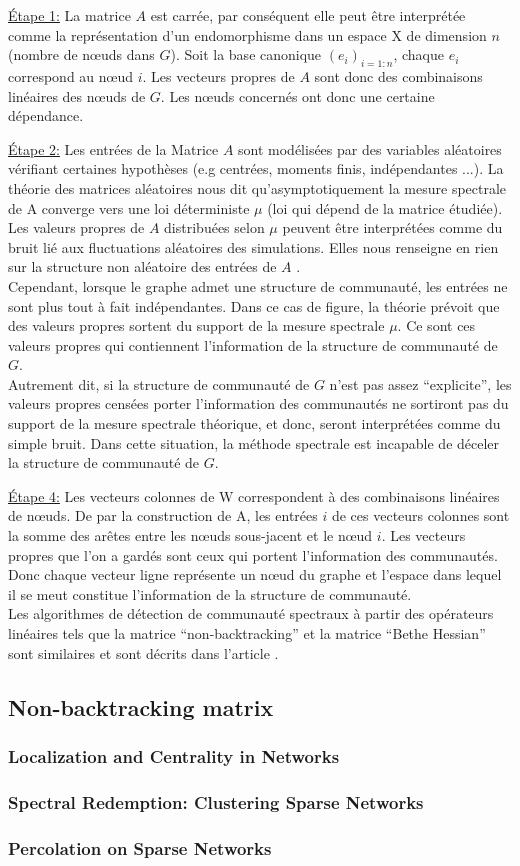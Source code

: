 \par{\underline{Étape 1:}}
La matrice $A$ est carrée, par conséquent elle peut être interprétée comme la représentation d'un endomorphisme dans un espace X de dimension $n$ (nombre de nœuds dans $G$).
Soit la base canonique $(e_i)_{i=1:n}$, chaque $e_i$ correspond au nœud $i$.
Les vecteurs propres de $A$ sont donc des combinaisons linéaires des nœuds de $G$.
Les nœuds concernés ont donc une certaine dépendance.
\par{\underline{Étape 2:}}
Les entrées de la Matrice $A$ sont modélisées par des variables aléatoires vérifiant certaines hypothèses (e.g centrées, moments finis, indépendantes ...).
La théorie des matrices aléatoires nous dit qu’asymptotiquement la mesure spectrale de A converge vers une loi déterministe $\mu$ (loi qui dépend de la matrice étudiée).
Les valeurs propres de $A$ distribuées selon $\mu$ peuvent être interprétées comme du bruit lié aux fluctuations aléatoires des simulations.
Elles nous renseigne en rien sur la structure non aléatoire des entrées de $A$ .\\
Cependant, lorsque le graphe admet une structure de communauté, les entrées ne sont plus tout à fait indépendantes.
Dans ce cas de figure, la théorie prévoit que des valeurs propres sortent du support de la mesure spectrale $\mu$.
Ce sont ces valeurs propres qui contiennent l'information de la structure de communauté de $G$.\\
Autrement dit, si la structure de communauté de $G$ n'est pas assez ``explicite'', les valeurs propres censées porter l'information des communautés ne sortiront pas du support de la mesure spectrale théorique, et donc, seront interprétées comme du simple bruit.
Dans cette situation, la méthode spectrale est incapable de déceler la structure de communauté de $G$.
\par{\underline{Étape 4:}}
Les vecteurs colonnes de W correspondent à des combinaisons linéaires de nœuds.
De par la construction de A, les entrées $i$ de ces vecteurs colonnes sont la somme des arêtes entre les nœuds sous-jacent et le nœud $i$.
Les vecteurs propres que l'on a gardés sont ceux qui portent l'information des communautés.
Donc chaque vecteur ligne représente un nœud du graphe et l'espace dans lequel il se meut constitue l'information de la structure de communauté.\\

Les algorithmes de détection de communauté spectraux à partir des opérateurs linéaires tels que la matrice ``non-backtracking'' et la matrice ``Bethe Hessian'' sont similaires et sont décrits dans l'article \cite[Spectral detection in the censored block model]{Spectral_Detection_in_the_Censored_Block_Model}.

\subsection{Non-backtracking matrix}
\subsubsection{Localization and Centrality in Networks }
\subsubsection{Spectral Redemption: Clustering Sparse Networks}
\subsubsection{Percolation on Sparse Networks}
